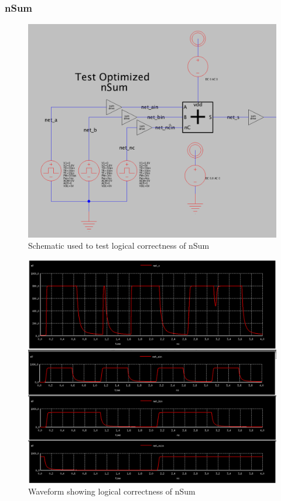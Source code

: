 \documentclass{article}
\begin{document}
\subsubsection{nSum}
\begin{figure}[H]
  \includegraphics[width=\linewidth]{opt_screenshots/test_logic_nsum_out_sch.png}
  \caption{Schematic used to test logical correctness of nSum}
  \label{fig:test_logic_nsum_out_sch}
\end{figure}

\begin{figure}[H]
  \includegraphics[width=\linewidth]{opt_screenshots/test_logic_nsum_out.png}
  \caption{Waveform showing logical correctness of nSum}
  \label{fig:test_logic_nsum_out}
\end{figure}
\end{document}
